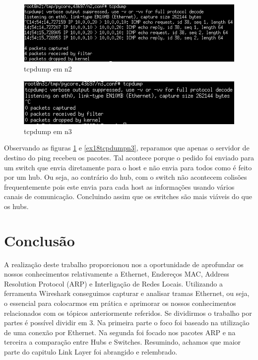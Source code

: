 \documentclass[a4paper]{report}
\begin{document}
\begin{figure}[H]
    \centering 
    \includegraphics[width=\textwidth]{images/ex18tcpdumpn2.png}
    \caption{tcpdump em n2}
    \label{fig:ex18tcpdumpn2}
\end{figure}

\begin{figure}[H]
    \centering 
    \includegraphics[width=\textwidth]{images/ex18tcpdumpn3.png}
    \caption{tcpdump em n3}
    \label{fig:ex18tcpdumpn3}
\end{figure}

Observando as figuras \ref{fig:ex18tcpdumpn2} e \ref{ex18tcpdumpn3}, reparamos
que apenas o servidor de destino do ping recebeu os pacotes. Tal acontece
porque o pedido foi enviado para um switch que envia diretamente para o host e não
envia para todos como é feito por um hub. Ou seja, ao contrário do hub, com o switch
não acontecem colisões frequentemente pois este envia para cada host as informações 
usando vários canais de comunicação. Concluindo assim que os switches são mais viáveis 
do que os hubs.

\chapter{Conclusão}

A realização deste trabalho proporcionou nos a oportunidade de aprofundar os nossos 
conhecimentos relativamente a Ethernet, Endereços MAC, Address Resolution Protocol (ARP)
e Interligação de Redes Locais. Utilizando a ferramenta Wireshark conseguimos capturar
e analisar tramas Ethernet, ou seja, o essencial para colocarmos em prática e aprimorar
os nossos conhecimentos relacionados com os tópicos anteriormente referidos.
Se dividirmos o trabalho por partes é possível dividir em 3.
Na primeira parte o foco foi baseado na utilização de uma conexão por Ethernet. Na segunda
foi focado nos pacotes ARP e na terceira a comparação entre Hubs e Switches.
Resumindo, achamos que maior parte do capitulo Link Layer foi abrangido e relembrado.
\end{document}
